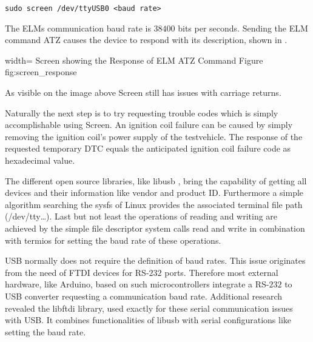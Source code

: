 \begin{verbatim}
sudo screen /dev/ttyUSB0 <baud rate> 
\end{verbatim}

The ELMs communication baud rate is $38400$ bits per seconds. Sending the ELM command ATZ causes the device to respond with its description, shown in .

 {width=\textwidth}%
 {Screen showing the Response of ELM ATZ Command}%
 {Figure}%
 {fig:screen_response}%

As visible on the image above Screen still has issues with carriage returns.

Naturally the next step is to try requesting trouble codes which is simply accomplishable using Screen. An ignition coil failure can be
caused by simply removing the ignition coil's power supply of the testvehicle. The response of the requested temporary DTC equals the anticipated 
ignition coil failure code as hexadecimal value. 


The different open source libraries, like libusb \cite{LIBUSB}, bring the capability of getting all devices and their information like vendor and product ID.
Furthermore a simple algorithm searching the sysfs of Linux provides the associated terminal file path (/dev/tty…). Last but not least the 
operations of reading and writing are achieved by the simple file descriptor system calls read and write in combination with termios for 
setting the baud rate of these operations. 

USB normally does not require the definition of baud rates. This issue originates from the need of FTDI devices for RS-$232$ ports. Therefore most
external hardware, like Arduino, based on such microcontrollers integrate a RS-$232$ to USB converter requesting a communication baud rate. Additional 
research revealed the libftdi library, used exactly for these serial communication issues with USB. It combines functionalities of libusb with serial
configurations like setting the baud rate. 

